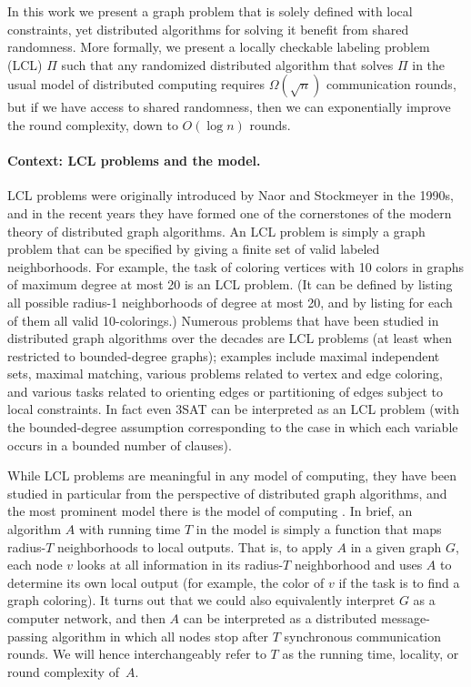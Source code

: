 \documentclass[11pt]{article}
\begin{document}
In this work we present a graph problem that is solely defined with local constraints, yet distributed algorithms for solving it benefit from shared randomness.
More formally, we present a locally checkable labeling problem (LCL) $\Pi$ such
that any randomized distributed algorithm that solves $\Pi$ in the usual \local
model of distributed computing requires $\Omega(\sqrt{n})$ communication rounds,
but if we have access to shared randomness, then we can exponentially improve the
round complexity, down to $O(\log n)$ rounds.

\paragraph{\boldmath Context: LCL problems and the \local model.}

LCL problems were originally introduced by Naor and Stockmeyer
\cite{naor-stockmeyer1995} in the 1990s, and in the recent years they have
formed one of the cornerstones of the modern theory of distributed graph
algorithms. An LCL problem is simply a graph problem that can be specified by
giving a finite set of valid labeled neighborhoods. For example, the task of
coloring vertices with 10 colors in graphs of maximum degree at most 20 is an
LCL problem. (It can be defined by listing all possible radius-1 neighborhoods
of degree at most 20, and by listing for each of them all valid 10-colorings.)
Numerous problems that have been studied in distributed graph algorithms over
the decades are LCL problems (at least when restricted to bounded-degree
graphs); examples include maximal independent sets, maximal matching, various
problems related to vertex and edge coloring, and various tasks related to
orienting edges or partitioning of edges subject to local constraints. In fact 
even 3SAT can be interpreted as an LCL problem (with the bounded-degree
assumption corresponding to the case in which each variable occurs in a bounded
number of clauses).

While LCL problems are meaningful in any model of computing, they have been studied in particular from the perspective of distributed graph algorithms, and the most prominent model there is the \local model of computing \cite{linial92,peleg00distributed}. In brief, an algorithm $A$ with running time $T$ in the \local model is simply a function that maps radius-$T$ neighborhoods to local outputs. That is, to apply $A$ in a given graph $G$, each node $v$ looks at all information in its radius-$T$ neighborhood and uses $A$ to determine its own local output (for example, the color of $v$ if the task is to find a graph coloring). It turns out that we could also equivalently interpret $G$ as a computer network, and then $A$ can be interpreted as a distributed message-passing algorithm in which all nodes stop after $T$ synchronous communication rounds. We will hence interchangeably refer to $T$ as the running time, locality, or round complexity of~$A$.
\end{document}
